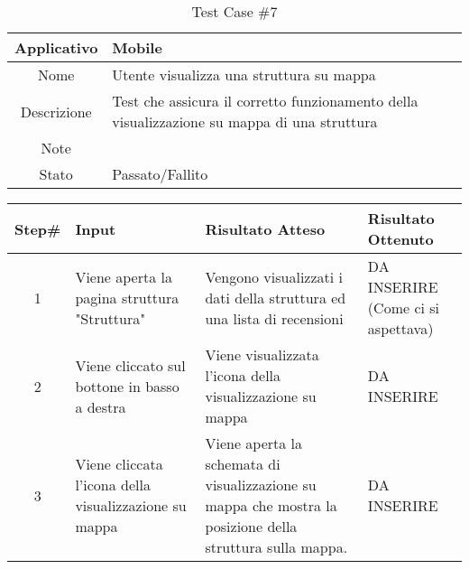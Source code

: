 
\begin{table}[H]
    \centering
    \footnotesize
    \caption{Test Case \#7}
    \begin{tabularx}{\textwidth}{|c|X|}
        \hline
        Applicativo & Mobile\\
        \hline
        Nome & Utente visualizza una struttura su mappa  \\
        \hline
        Descrizione & Test che assicura il corretto funzionamento della visualizzazione su mappa di una struttura\\
        \hline
        Note & \\
        \hline
        Stato & Passato/Fallito\\
        \hline

    \end{tabularx}
    \setlength{\tabcolsep}{8pt}
    \renewcommand{\arraystretch}{1.5}
\end{table}

\begin{table}[H]
    \footnotesize
    \begin{tabularx}{\textwidth}{|c|X|X|X|}
        \hline
        Step\# & Input & Risultato Atteso & Risultato Ottenuto \\
        \hline
         1 & Viene aperta la pagina struttura "Struttura"
         & Vengono visualizzati i dati della struttura ed una lista di recensioni
         &DA INSERIRE (Come ci si aspettava)\\
          \hline
        2 & Viene cliccato sul bottone in basso a destra
        & Viene visualizzata l'icona della visualizzazione su mappa
        & DA INSERIRE\\
        3 & Viene cliccata l'icona della visualizzazione su mappa
        & Viene aperta la schemata di visualizzazione su mappa che mostra la posizione della struttura sulla mappa.
        & DA INSERIRE\\
\hline
    \end{tabularx}
\end{table}
    
       
